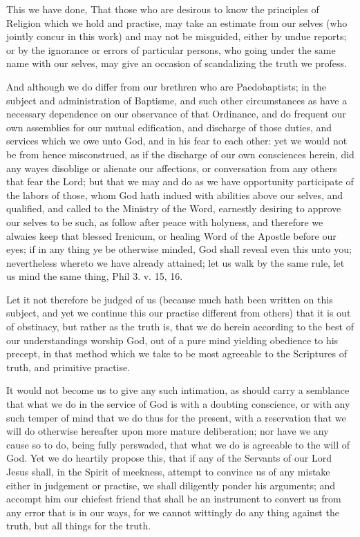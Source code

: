 \documentclass[12pt,a4paper]{book}
\begin{document}
This we have done, That those who are desirous to know the principles of Religion which we hold and practise, may take an estimate from our selves (who jointly concur in this work) and may not be misguided, either by undue reports; or by the ignorance or errors of particular persons, who going under the same name with our selves, may give an occasion of scandalizing the truth we profess.

And although we do differ from our brethren who are Paedobaptists; in the subject and administration of Baptisme, and such other circumstances as have a necessary dependence on our observance of that Ordinance, and do frequent our own assemblies for our mutual edification, and discharge of those duties, and services which we owe unto God, and in his fear to each other: yet we would not be from hence misconstrued, as if the discharge of our own consciences herein, did any wayes disoblige or alienate our affections, or conversation from any others that fear the Lord; but that we may and do as we have opportunity participate of the labors of those, whom God hath indued with abilities above our selves, and qualified, and called to the Ministry of the Word, earnestly desiring to approve our selves to be such, as follow after peace with holyness, and therefore we alwaies keep that blessed Irenicum, or healing Word of the Apostle before our eyes; if in any thing ye be otherwise minded, God shall reveal even this unto you; nevertheless whereto we have already attained; let us walk by the same rule, let us mind the same thing, Phil 3. v. 15, 16.

Let it not therefore be judged of us (because much hath been written on this subject, and yet we continue this our practise different from others) that it is out of obstinacy, but rather as the truth is, that we do herein according to the best of our understandings worship God, out of a pure mind yielding obedience to his precept, in that method which we take to be most agreeable to the Scriptures of truth, and primitive practise.

It would not become us to give any such intimation, as should carry a semblance that what we do in the service of God is with a doubting conscience, or with any such temper of mind that we do thus for the present, with a reservation that we will do otherwise hereafter upon more mature deliberation; nor have we any cause so to do, being fully perswaded, that what we do is agreeable to the will of God. Yet we do heartily propose this, that if any of the Servants of our Lord Jesus shall, in the Spirit of meekness, attempt to convince us of any mistake either in judgement or practise, we shall diligently ponder his arguments; and accompt him our chiefest friend that shall be an instrument to convert us from any error that is in our ways, for we cannot wittingly do any thing against the truth, but all things for the truth.
\end{document}
